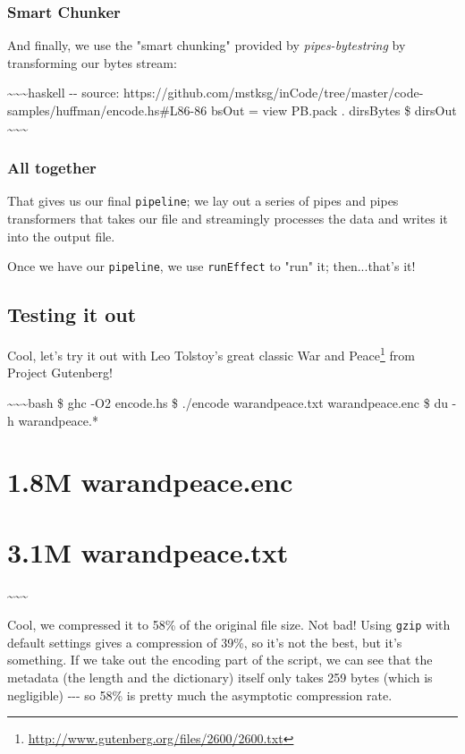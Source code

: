 \documentclass[]{article}
\renewcommand{\href}[2]{#2\footnote{\url{#1}}}
\begin{document}
\subsubsection{Smart Chunker}

And finally, we use the "smart chunking" provided by \emph{pipes-bytestring} by
transforming our bytes stream:

\textasciitilde{}\textasciitilde{}\textasciitilde{}haskell -\/- source:
https://github.com/mstksg/inCode/tree/master/code-samples/huffman/encode.hs\#L86-86
bsOut = view PB.pack . dirsBytes \$ dirsOut
\textasciitilde{}\textasciitilde{}\textasciitilde{}

\subsubsection{All together}

That gives us our final \texttt{pipeline}; we lay out a series of pipes and
pipes transformers that takes our file and streamingly processes the data and
writes it into the output file.

Once we have our \texttt{pipeline}, we use \texttt{runEffect} to "run" it;
then...that's it!

\subsection{Testing it out}

Cool, let's try it out with Leo Tolstoy's great classic
\href{http://www.gutenberg.org/files/2600/2600.txt}{War and Peace} from Project
Gutenberg!

\textasciitilde{}\textasciitilde{}\textasciitilde{}bash \$ ghc -O2 encode.hs \$
./encode warandpeace.txt warandpeace.enc \$ du -h warandpeace.*

\section{1.8M warandpeace.enc}

\section{3.1M warandpeace.txt}

\textasciitilde{}\textasciitilde{}\textasciitilde{}

Cool, we compressed it to 58\% of the original file size. Not bad! Using
\texttt{gzip} with default settings gives a compression of 39\%, so it's not the
best, but it's something. If we take out the encoding part of the script, we can
see that the metadata (the length and the dictionary) itself only takes 259
bytes (which is negligible) -\/-\/- so 58\% is pretty much the asymptotic
compression rate.
\end{document}
